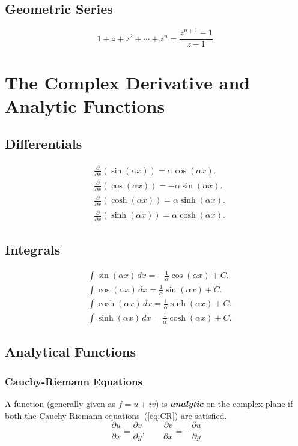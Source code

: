 \documentclass{article}
\begin{document}
\subsection{Geometric Series}
\begin{equation}
    1+z+z^2+\cdots+z^n = \frac{z^{n+1}-1}{z-1}.
\end{equation}


\section{The Complex Derivative and Analytic Functions}
\subsection{Differentials}
\begin{align}
    &\frac{\partial}{\partial x}(\sin(\alpha x)) = \alpha\cos(\alpha x).\\
    &\frac{\partial}{\partial x}(\cos(\alpha x)) = -\alpha\sin(\alpha x).\\
    &\frac{\partial}{\partial x}(\cosh(\alpha x)) = \alpha\sinh(\alpha x).\\
    &\frac{\partial}{\partial x}(\sinh(\alpha x)) = \alpha\cosh(\alpha x).
\end{align}

\subsection{Integrals}
\begin{align}
    &\int\sin(\alpha x)\, dx =  -\frac{1}{\alpha}\cos(\alpha x) + C.\\
    &\int\cos(\alpha x)\, dx =  \frac{1}{\alpha}\sin(\alpha x) + C.\\
    &\int\cosh(\alpha x)\, dx =  \frac{1}{\alpha}\sinh(\alpha x) + C.\\
    &\int\sinh(\alpha x)\, dx =  \frac{1}{\alpha}\cosh(\alpha x) + C.
\end{align}

\subsection{Analytical Functions}
\subsubsection{Cauchy-Riemann Equations}
A function (generally given as $f = u +iv$) is \textbf{\textit{analytic}} on the complex plane if both the Cauchy-Riemann equations~(\ref{eq:CR}) are satisfied.
\begin{equation}
    \frac{\partial u}{\partial x} = \frac{\partial v}{\partial y},\qquad \frac{\partial v}{\partial x} = -\frac{\partial u}{\partial y}\label{eq:CR}
\end{equation}
\end{document}
